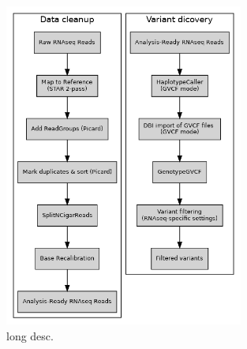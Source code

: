 \begin{figure}
	\begin{center}
		
		\includegraphics[width=0.7\textwidth]{misc/workflow.png}
		\caption[caption] {long desc.}
		
	\end{center}
\end{figure}
